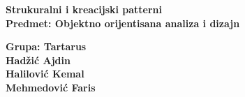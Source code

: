 \documentclass[12pt, a4paper]{report}
\theoremstyle{definition}
\begin{document}
	\begin{titlepage}
		\newcommand{\HRule}{\rule{\linewidth}{1mm}} 
		\noindent
		{\large
			
			
			
			\begin{center}
				\LARGE 
				\bfseries 
				Strukuralni i kreacijski patterni \\
			
				
				\large 
			Predmet: Objektno orijentisana analiza i dizajn
				\\[6.0 cm] 
			\end{center}	 		
			

			\begin{minipage}{0.9\textwidth}
				\begin{flushright}
					\textbf{Grupa: Tartarus}  \\
					\textbf{Hadžić Ajdin}  \\	
					\textbf{Halilović Kemal}  \\
					\textbf{Mehmedović Faris} \\
				\end{flushright}
			\end{minipage}\\[1 cm]
		}
	\end{titlepage}
\end{document}

